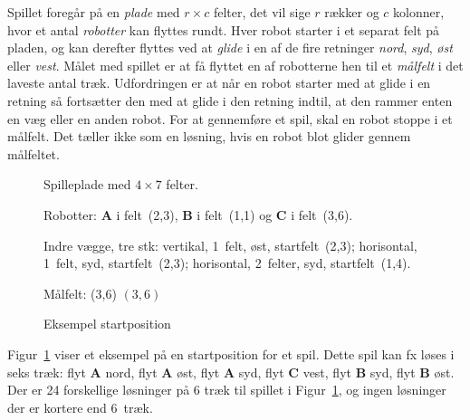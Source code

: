 Spillet foregår på en \emph{plade} med $r \times c$ felter, det vil
sige $r$ rækker og $c$ kolonner, hvor et antal
\emph{robotter} kan flyttes rundt. Hver robot starter i et separat felt på
pladen, og kan derefter flyttes ved at \emph{glide} i en af de fire
retninger \emph{nord}, \emph{syd}, \emph{øst} eller \emph{vest}. Målet
med spillet er at få flyttet en af robotterne hen til et
\emph{målfelt} i det laveste antal træk. Udfordringen er at når en
robot starter med at glide i en retning så fortsætter den med at glide
i den retning indtil, at den rammer enten en væg eller en anden
robot. For at gennemføre et spil, skal en robot stoppe i et
målfelt. Det tæller ikke som en løsning, hvis en robot blot glider
gennem målfeltet.

\begin{figure}
\hfill
\begin{minipage}[t]{0.4\linewidth}
  \raggedright\setlength{\parskip}{1ex}
  Spilleplade med $4\times 7$ felter.

  Robotter: \textbf{A} i felt~(2,3), \textbf{B} i felt~(1,1) og
  \textbf{C} i felt~(3,6).

  Indre vægge, tre stk: vertikal, 1~felt, øst,
startfelt~(2,3); horisontal, 1~felt, syd, startfelt~(2,3); horisontal,
2~felter, syd, startfelt~(1,4).

  Målfelt: (3,6) $(3,6)$
\end{minipage}
  \caption{Eksempel startposition}
  \label{fig:example}
\end{figure}

Figur~\ref{fig:example} viser et eksempel på en startposition for et
spil. Dette spil kan fx løses i seks træk: flyt \textbf{A} nord, flyt
\textbf{A} øst, flyt \textbf{A} syd, flyt \textbf{C} vest, flyt
\textbf{B} syd, flyt \textbf{B} øst. Der er 24 forskellige løsninger
på 6 træk til spillet i Figur~\ref{fig:example}, og ingen løsninger der er
kortere end 6~træk.

